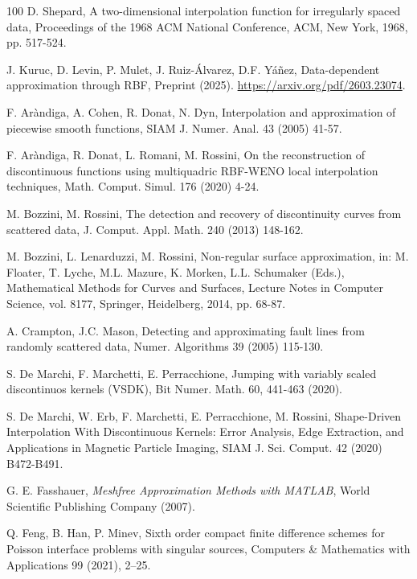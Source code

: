 \documentclass[preprint]{elsarticle}       %
\begin{document}
\begin{thebibliography}{100}
D. Shepard, A two-dimensional interpolation function for irregularly spaced data, Proceedings of the 1968 ACM National Conference, ACM, New York, 1968, pp. 517-524.

 J. Kuruc, D. Levin, P. Mulet, J. Ruiz-\'Alvarez, D.F. Y\'a\~nez, Data-dependent approximation through RBF, Preprint (2025). \href{https://arxiv.org/pdf/2603.23074}{https://arxiv.org/pdf/2603.23074}.

 F. Ar\`andiga, A. Cohen, R. Donat, N. Dyn, Interpolation and approximation of piecewise smooth functions, SIAM J. Numer. Anal. 43 (2005) 41-57.

 F. Ar\`andiga, R. Donat, L. Romani, M. Rossini, On the reconstruction of discontinuous functions using multiquadric RBF-WENO local interpolation techniques, Math. Comput. Simul. 176 (2020) 4-24.

 M. Bozzini, M. Rossini, The detection and recovery of discontinuity curves from scattered data, J. Comput. Appl. Math. 240 (2013) 148-162.

 M. Bozzini, L. Lenarduzzi, M. Rossini, Non-regular surface approximation, in: M. Floater, T. Lyche, M.L. Mazure, K. Morken, L.L. Schumaker (Eds.), Mathematical Methods for Curves and Surfaces, Lecture Notes in Computer Science, vol. 8177, Springer, Heidelberg, 2014, pp. 68-87.

 A. Crampton, J.C. Mason, Detecting and approximating fault lines from randomly scattered data, Numer. Algorithms 39 (2005) 115-130.

 S. De Marchi, F. Marchetti, E. Perracchione, Jumping with variably scaled discontinuos kernels (VSDK), Bit Numer. Math. 60, 441-463 (2020).

 S. De Marchi, W. Erb, F. Marchetti, E. Perracchione, M. Rossini, Shape-Driven Interpolation With Discontinuous Kernels: Error Analysis, Edge Extraction, and Applications in Magnetic Particle Imaging, SIAM J. Sci. Comput. 42 (2020) B472-B491.

 G. E. Fasshauer, \textit{Meshfree Approximation Methods with MATLAB}, World Scientific Publishing Company (2007).

Q. Feng, B. Han, P. Minev, Sixth order compact finite difference schemes for Poisson interface problems with singular sources, Computers \& Mathematics with Applications 99 (2021), 2--25.


\end{thebibliography}
\end{document}
